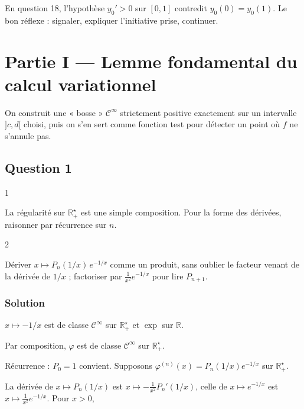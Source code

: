 \documentclass[11pt,a4paper]{article}
\begin{document}
En question 18, l'hypothèse \(y_0'>0\) sur \([0,1]\) contredit \(y_0(0)=y_0(1)\). Le bon réflexe : signaler, expliquer l'initiative prise, continuer.

\hypertarget{partie-i-lemme-fondamental-du-calcul-variationnel}{%
\section{Partie I --- Lemme fondamental du calcul variationnel}\label{partie-i-lemme-fondamental-du-calcul-variationnel}}

On construit une « bosse » \(\mathcal C^\infty\) strictement positive exactement sur un intervalle \(]c,d[\) choisi, puis on s'en sert comme fonction test pour détecter un point où \(f\) ne s'annule pas.

\hypertarget{question-1}{%
\subsection{Question 1}\label{question-1}}

\begin{indication}{1}

La régularité sur \(\mathbb R_+^\star\) est une simple composition. Pour la forme des dérivées, raisonner par récurrence sur \(n\).

\end{indication}

\begin{indication}{2}

Dériver \(x\mapsto P_n(1/x)\,e^{-1/x}\) comme un produit, sans oublier le facteur venant de la dérivée de \(1/x\) ; factoriser par \(\frac1{x^2}e^{-1/x}\) pour lire \(P_{n+1}\).

\end{indication}

\hypertarget{solution}{%
\subsubsection{Solution}\label{solution}}

\(x\mapsto-1/x\) est de classe \(\mathcal C^\infty\) sur \(\mathbb R_+^\star\) et \(\exp\) sur \(\mathbb R\).

Par composition, \(\varphi\) est de classe \(\mathcal C^\infty\) sur \(\mathbb R_+^\star\).

Récurrence : \(P_0=1\) convient. Supposons \(\varphi^{(n)}(x)=P_n(1/x)e^{-1/x}\) sur \(\mathbb R_+^\star\).

La dérivée de \(x\mapsto P_n(1/x)\) est \(x\mapsto-\frac1{x^2}P_n'(1/x)\), celle de \(x\mapsto e^{-1/x}\) est \(x\mapsto\frac1{x^2}e^{-1/x}\). Pour \(x>0\),
\end{document}
